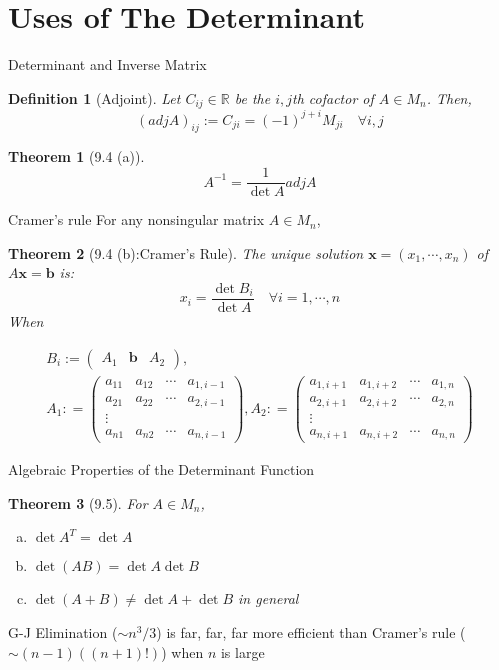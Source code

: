 \documentclass[a4paper,11pt]{article}
\newtheorem{defn}{Definition}
\newtheorem{thm}{Theorem}
\begin{document}
\section{Uses of The Determinant} %
\label{sec:uses_of_the_determinant}
\begin{frame}[t]{Determinant and Inverse Matrix}
	\begin{defn}
		[Adjoint] Let $C_{ij}\in\mathbb{R}$ be the $i,j$th cofactor of $A\in M_n$. Then, \[
			(adj A)_{ij}:=C_{ji} = (-1)^{j+i}M_{ji} \quad\forall i,j
		\]
	\end{defn}
	\begin{thm}
		[9.4 (a)]\[
			A^{-1} = \frac{1}{\det A}adj A
		\]
	\end{thm}
\end{frame}
\begin{frame}[t]{Cramer's rule}
	For any nonsingular matrix $A\in M_n$,
	\begin{thm}
		[9.4 (b):Cramer's Rule]
			The unique solution $\mathbf{x}=(x_1,\cdots,x_n)$ of $A\mathbf{x}=\mathbf{b}$ is:
			\[
				x_i = \frac{\det B_i}{\det A} \quad\forall i=1,\cdots,n
			\] When 
			\begin{tiny}
				\begin{multline*}
					B_i := \begin{pmatrix}
						A_1 & \mathbf{b} & A_2
					\end{pmatrix},\\ A_1 : = \begin{pmatrix}
						a_{11}&a_{12}&\cdots&a_{1,i-1}\\
						a_{21}&a_{22}&\cdots&a_{2,i-1}\\
						\vdots\\
						a_{n1}&a_{n2}&\cdots&a_{n,i-1}
					\end{pmatrix}, A_2 : = \begin{pmatrix}
						a_{1,i+1}&a_{1,i+2}&\cdots&a_{1,n}\\
						a_{2,i+1}&a_{2,i+2}&\cdots&a_{2,n}\\
						\vdots\\
						a_{n,i+1}&a_{n,i+2}&\cdots&a_{n,n}
					\end{pmatrix}
				\end{multline*}
			\end{tiny}
	\end{thm}
\end{frame}
\begin{frame}[t]{Algebraic Properties of the Determinant Function}
	\begin{thm}
		[9.5] For $A\in M_n$, 
		\begin{enumerate}[(a)]
			\item $\det A^T = \det A$
			\item $\det(AB)=\det A \det B$
			\item $\det(A+B)\neq \det A + \det B$ in general
		\end{enumerate}
	\end{thm}
	G-J Elimination ($\sim n^3/3$) is far, far, far more efficient than Cramer's rule ($\sim (n-1)((n+1)!)$) when $n$ is large
\end{frame}
\end{document}

